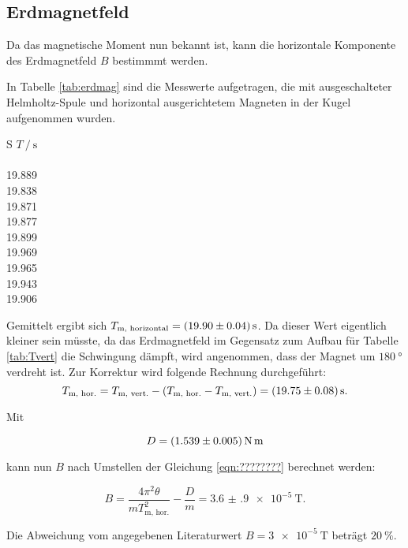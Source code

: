 \subsection{Erdmagnetfeld}

Da das magnetische Moment nun bekannt ist, kann die horizontale Komponente des
Erdmagnetfeld $B$ bestimmmt werden.

In Tabelle \ref{tab:erdmag} sind die Messwerte aufgetragen, die mit ausgeschalteter
Helmholtz-Spule und horizontal ausgerichtetem Magneten in der Kugel aufgenommen wurden.

\begin{table}[h]
  \centering
  \caption{Messwerte der Periodendauern bei horizontalem Magnet in der Kugel.}
  \label{tab:erdmag}
  \begin{tabular}{S}
    \toprule
    {$T\:/\:\si{\second}$} \\
     \\
    19.889 \\
    19.838 \\
    19.871 \\
    19.877 \\
    19.899 \\
    19.969 \\
    19.965 \\
    19.943 \\
    19.906 \\
    \bottomrule
  \end{tabular}
\end{table}

Gemittelt ergibt sich $T_{\text{m, horizontal}} = \SI{19.90 +- 0.04}{\second}$.
Da dieser Wert eigentlich kleiner sein müsste, da das Erdmagnetfeld im Gegensatz
zum Aufbau für Tabelle \ref{tab:Tvert} die Schwingung dämpft, wird angenommen, dass
der Magnet um $\SI{180}{\degree}$ verdreht ist. Zur Korrektur wird folgende Rechnung durchgeführt:
\begin{equation}
  T_{\text{m, hor.}} = T_{\text{m, vert.}} - (T_{\text{m, hor.}}-T_{\text{m, vert.}}) = \SI{19.75 +- 0.08}{\second}.
\end{equation}


Mit

\begin{equation}
  D = \SI{1.539 +- 0.005}{\newton\meter}
\end{equation}

kann nun $B$ nach Umstellen der Gleichung \eqref{eqn:????????} berechnet werden:

\begin{equation}
  B = \frac{4\pi^2\theta}{m T_{\text{m, hor.}}^2} - \frac{D}{m} = \SI{3.6(9)e-5}{\tesla}.
\end{equation}

Die Abweichung vom angegebenen Literaturwert $B = \SI{3e-5}{\tesla}$ beträgt $\SI{20}{\percent}$.
